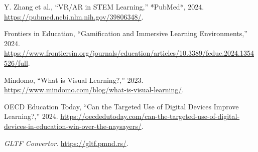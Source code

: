 \documentclass{thesis.cs.pub.ro}
\begin{document}
\begin{thebibliography}{99}
Y. Zhang et al., “VR/AR in STEM Learning,” *PubMed*, 2024. \href{https://pubmed.ncbi.nlm.nih.gov/39806348/}{https://pubmed.ncbi.nlm.nih.gov/39806348/}.

Frontiers in Education, “Gamification and Immersive Learning Environments,” 2024. \href{https://www.frontiersin.org/journals/education/articles/10.3389/feduc.2024.1354526/full}{https://www.frontiersin.org/journals/education/articles/10.3389/feduc.2024.1354526/full}.

Mindomo, “What is Visual Learning?,” 2023. \href{https://www.mindomo.com/blog/what-is-visual-learning/}{https://www.mindomo.com/blog/what-is-visual-learning/}.

OECD Education Today, “Can the Targeted Use of Digital Devices Improve Learning?,” 2024. \href{https://oecdedutoday.com/can-the-targeted-use-of-digital-devices-in-education-win-over-the-naysayers/}{https://oecdedutoday.com/can-the-targeted-use-of-digital-devices-in-education-win-over-the-naysayers/}.

\textit{GLTF Convertor}. \href{https://gltf.pmnd.rs/}{https://gltf.pmnd.rs/}.


\end{thebibliography}


\printindex
\end{document}
